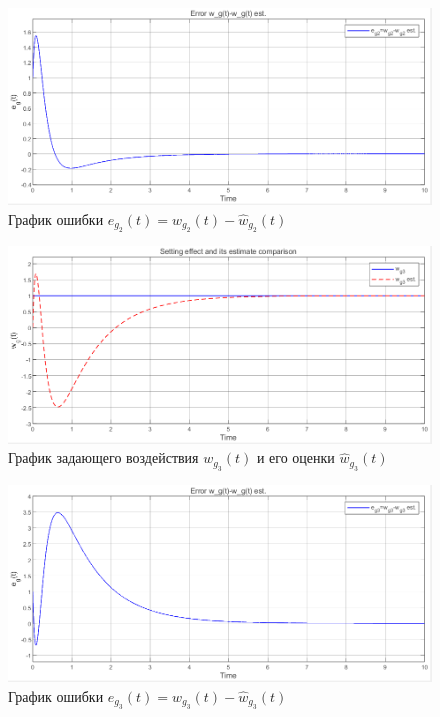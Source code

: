 \documentclass[a4paper, 12pt]{article}
\begin{document}
    \begin{figure}[H]
        \centering
        \includegraphics[scale=0.6]{2task_eg2.png}
        \captionsetup{skip=0pt}
        \caption{График ошибки $e_{g_2}(t)=w_{g_2}(t)-\hat{w}_{g_2}(t)$}
        \label{fig:2task_eg2}
    \end{figure}
    \begin{figure}[H]
        \centering
        \includegraphics[scale=0.6]{2task_wghwg3.png}
        \captionsetup{skip=0pt}
        \caption{График задающего воздействия $w_{g_3}(t)$ и его оценки $\hat{w}_{g_3}(t)$}
        \label{fig:2task_wghwg3}
    \end{figure}
    \begin{figure}[H]
        \centering
        \includegraphics[scale=0.6]{2task_eg3.png}
        \captionsetup{skip=0pt}
        \caption{График ошибки $e_{g_3}(t)=w_{g_3}(t)-\hat{w}_{g_3}(t)$}
        \label{fig:2task_eg3}
    \end{figure}
\end{document}
